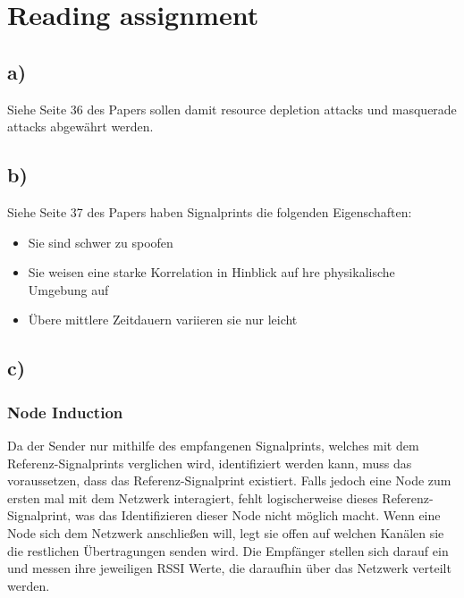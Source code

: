 \documentclass[12pt,a4paper]{article}
\begin{document}
\begin{comment}
\begin{figure}[ht!]
\centering
	\texttt{[image: images\_files/Aufgabe-3d).png]}
	\caption{Vergleich}
	\label{fig:YourLabe7}
\end{figure}

\newpage



\end{comment}

\section{Reading assignment}

\subsection{a)} 
Siehe Seite 36 des Papers sollen damit resource depletion attacks und masquerade attacks abgewährt werden.


\subsection{b)} 
Siehe Seite 37 des Papers haben Signalprints die folgenden Eigenschaften:

\begin{itemize}
	\item Sie sind schwer zu spoofen 
	\item Sie weisen eine starke Korrelation in Hinblick auf hre physikalische Umgebung auf
	\item Übere mittlere Zeitdauern variieren sie nur leicht 
\end{itemize}


\subsection{c)} 

\subsubsection*{Node Induction}
Da der Sender nur mithilfe des empfangenen Signalprints,
welches mit dem Referenz-Signalprints verglichen wird, identifiziert werden kann, muss das voraussetzen, dass das
Referenz-Signalprint existiert. Falls jedoch eine Node zum ersten mal mit dem Netzwerk interagiert, fehlt logischerweise
dieses Referenz-Signalprint, was das Identifizieren dieser Node nicht möglich macht. Wenn eine Node sich dem Netzwerk anschließen will, legt sie offen auf welchen Kanälen sie die restlichen Übertragungen senden wird. Die Empfänger stellen sich darauf ein und messen ihre jeweiligen RSSI Werte, die daraufhin über das Netzwerk verteilt werden. 
\end{document}
